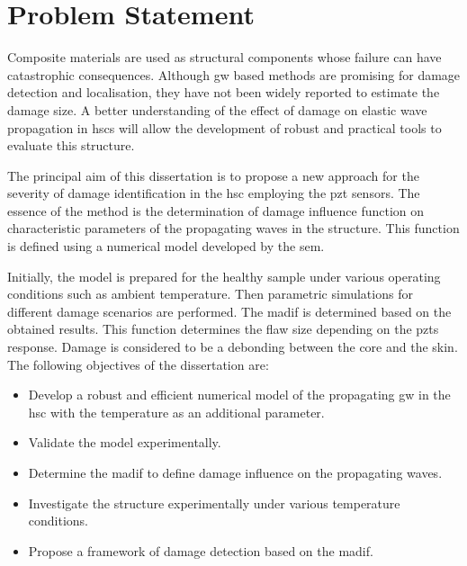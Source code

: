 

\chapter[Problem Statement]{Problem Statement}
\label{ch:problem}



Composite materials are used as structural components whose failure can have catastrophic consequences.
Although \ac{gw} based methods are promising for damage detection and localisation, they have not been widely reported to estimate the damage size.
A better understanding of the effect of damage on elastic wave propagation in \acp{hsc} will allow the development of robust and practical tools to evaluate this structure.

The principal aim of this dissertation is to propose a new approach for the severity of damage identification in the \ac{hsc} employing the \ac{pzt} sensors.
The essence of the method is the determination of damage influence function on characteristic parameters of the propagating waves in the structure.
This function is defined using a numerical model developed by the \ac{sem}.

Initially, the model is prepared for the healthy sample under various operating conditions such as ambient temperature.
Then parametric simulations for different damage scenarios are performed.
The \ac{madif} is determined based on the obtained results. 
This function determines the flaw size depending on the \acp{pzt} response.
Damage is considered to be a debonding between the core and the skin. 
The following objectives of the dissertation are:
\begin{itemize}
	\item Develop a robust and efficient numerical model of the propagating \ac{gw} in the \ac{hsc} with the temperature as an additional parameter.
	\item Validate the model experimentally.
	\item Determine the \ac{madif} to define damage influence on the propagating waves.
	\item Investigate the structure experimentally under various temperature conditions.
	\item Propose a framework of damage detection based on the \ac{madif}.
\end{itemize}

